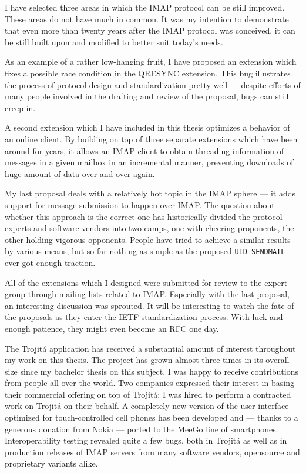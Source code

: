\documentclass[trojita]{subfiles}
\begin{document}
I have selected three areas in which the IMAP protocol can be still improved.  These areas do not have much in common.
It was my intention to demonstrate that even more than twenty years after the IMAP protocol was conceived, it can be
still built upon and modified to better suit today's needs.

As an example of a rather low-hanging fruit, I have proposed an extension which fixes a possible race condition in the
QRESYNC extension.  This bug illustrates the process of protocol design and standardization pretty well --- despite
efforts of many people involved in the drafting and review of the proposal, bugs can still creep in.

A second extension which I have included in this thesis optimizes a behavior of an online client.  By building on top of
three separate extensions which have been around for years, it allows an IMAP client to obtain threading information of
messages in a given mailbox in an incremental manner, preventing downloads of huge amount of data over and over again.

My last proposal deals with a relatively hot topic in the IMAP sphere --- it adds support for message submission to
happen over IMAP.  The question about whether this approach is the correct one has historically divided the protocol
experts and software vendors into two camps, one with cheering proponents, the other holding vigorous opponents.  People
have tried to achieve a similar results by various means, but so far nothing as simple as the proposed {\tt UID
SENDMAIL} ever got enough traction.

All of the extensions which I designed were submitted for review to the expert group through mailing lists related to
IMAP.  Especially with the last proposal, an interesting discussion was sprouted.  It will be interesting to watch the
fate of the proposals as they enter the IETF standardization process.  With luck and enough patience, they might even
become an RFC one day.

The Trojitá application has received a substantial amount of interest throughout my work on this thesis.  The project
has grown almost three times in its overall size since my bachelor thesis on this subject.  I was happy to receive
contributions from people all over the world.  Two companies expressed their interest in basing their commercial
offering on top of Trojitá; I was hired to perform a contracted work on Trojitá on their behalf.  A completely new
version of the user interface optimized for touch-controlled cell phones has been developed and --- thanks to a generous
donation from Nokia --- ported to the MeeGo line of smartphones.  Interoperability testing revealed quite a few bugs,
both in Trojitá as well as in production releases of IMAP servers from many software vendors, opensource and proprietary
variants alike.
\end{document}
